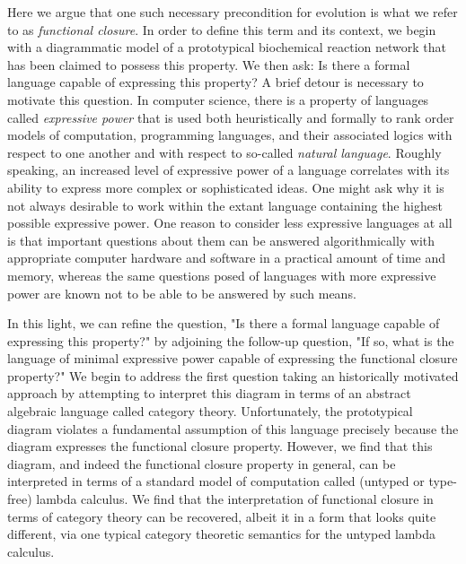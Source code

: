 \documentclass[10pt]{article}
\begin{document}
Here we argue that one such necessary precondition for evolution is what we refer to as \emph{functional closure}. In order to define this term and its context, we begin with a diagrammatic model of a prototypical biochemical reaction network that has been claimed to possess this property. We then ask: Is there a formal language capable of expressing this property? A brief detour is necessary to motivate this question. In computer science, there is a property of languages called \emph{expressive power} that is used both heuristically and formally to rank order models of computation, programming languages, and their associated logics with respect to one another and with respect to so-called \emph{natural language}. Roughly speaking, an increased level of expressive power of a language correlates with its ability to express more complex or sophisticated ideas. One might ask why it is not always desirable to work within the extant language containing the highest possible expressive power. One reason to consider less expressive languages at all is that important questions about them can be answered algorithmically with appropriate computer hardware and software in a practical amount of time and memory, whereas the same questions posed of languages with more expressive power are known not to be able to be answered by such means.

In this light, we can refine the question, "Is there a formal language capable of expressing this property?" by adjoining the follow-up question, "If so, what is the language of minimal expressive power capable of expressing the functional closure property?" We begin to address the first question taking an historically motivated approach by attempting to interpret this diagram in terms of an abstract algebraic language called category theory. Unfortunately, the prototypical diagram violates a fundamental assumption of this language precisely because the diagram expresses the functional closure property. However, we find that this diagram, and indeed the functional closure property in general, can be interpreted in terms of a standard model of computation called (untyped or type-free) lambda calculus. We find that the interpretation of functional closure in terms of category theory can be recovered, albeit it in a form that looks quite different, via one typical category theoretic semantics for the untyped lambda calculus.
\end{document}
